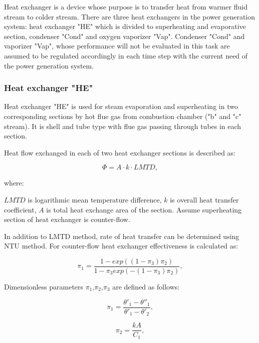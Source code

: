 \documentclass{article}
\begin{document}
	Heat exchanger is a device whose purpose is to transfer heat from warmer 
	fluid stream to colder stream. There are three heat exchangers in the power 
	generation system: heat exchanger "HE" which is divided to superheating and 
	evaporative section, condenser "Cond" and oxygen vaporizer "Vap". Condenser 
	"Cond" and vaporizer "Vap", whose performance will not be evaluated in this 
	task are assumed to be regulated accordingly in each time step with the 
	current need of the power generation system. 
	
	\subsubsection*{Heat exchanger "HE"}
	
	Heat exchanger "HE" is used for steam evaporation and superheating in two corresponding sections by hot flue gas from combustion chamber ("b" and "c" stream). It is shell and tube type with flue gas passing through tubes in each section. 
	
	Heat flow exchanged in each of two heat exchanger sections is described as:
	
	\begin{equation}\label{eq:heat_flow}
		\Phi = A \cdot k \cdot LMTD,
	\end{equation}
	
	where:
	
	\noindent
	$LMTD$ is logarithmic mean temperature difference, 
	$k$ is overall heat transfer coefficient,
	$A$ is total heat exchange area of the section. 
	Assume superheating section of heat exchanger is counter-flow.
	
	In addition to LMTD method, rate of heat transfer can be determined using NTU method. For counter-flow heat exchanger effectiveness is calculated as:
	
	\begin{equation}\label{eq:heat_exchanger_eff}
		\pi_1 = \frac{1 - exp((1-\pi_3)\pi_2)}{1-\pi_3exp(-(1-\pi_3)\pi_2)},
	\end{equation}
	
	Dimensionless parameters $\pi_1$,$\pi_2$,$\pi_3$ are defined as follows:
	
	\begin{equation}\label{eq:pi_params}
		\pi_1 = \frac{\theta'_1 - \theta''_1}{\theta'_1 - \theta'_2},
	\end{equation}
	
	\begin{equation}\label{eq:pi_params2}
		\pi_2 = \frac{kA}{C_1},
	\end{equation}
	
\end{document}
